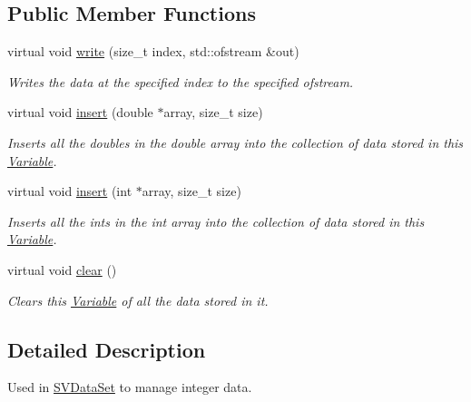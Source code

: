\subsection*{Public Member Functions}
\begin{DoxyCompactItemize}
\item 
virtual void \hyperlink{classrepast_1_1_int_variable_a21701e82f63a4ae02ea5edf24c2d39f6}{write} (size\-\_\-t index, std\-::ofstream \&out)
\begin{DoxyCompactList}\small\item\em Writes the data at the specified index to the specified ofstream. \end{DoxyCompactList}\item 
virtual void \hyperlink{classrepast_1_1_int_variable_a20ff24e57f87be9ea44b312630f13d1f}{insert} (double $\ast$array, size\-\_\-t size)
\begin{DoxyCompactList}\small\item\em Inserts all the doubles in the double array into the collection of data stored in this \hyperlink{classrepast_1_1_variable}{Variable}. \end{DoxyCompactList}\item 
virtual void \hyperlink{classrepast_1_1_int_variable_a22de6afa3d3e50b4f322b9667e7eb3a2}{insert} (int $\ast$array, size\-\_\-t size)
\begin{DoxyCompactList}\small\item\em Inserts all the ints in the int array into the collection of data stored in this \hyperlink{classrepast_1_1_variable}{Variable}. \end{DoxyCompactList}\item 
\hypertarget{classrepast_1_1_int_variable_a1b22f400a25e7afeb347d3f542000cca}{virtual void \hyperlink{classrepast_1_1_int_variable_a1b22f400a25e7afeb347d3f542000cca}{clear} ()}\label{classrepast_1_1_int_variable_a1b22f400a25e7afeb347d3f542000cca}

\begin{DoxyCompactList}\small\item\em Clears this \hyperlink{classrepast_1_1_variable}{Variable} of all the data stored in it. \end{DoxyCompactList}\end{DoxyCompactItemize}


\subsection{Detailed Description}
Used in \hyperlink{classrepast_1_1_s_v_data_set}{S\-V\-Data\-Set} to manage integer data. 

